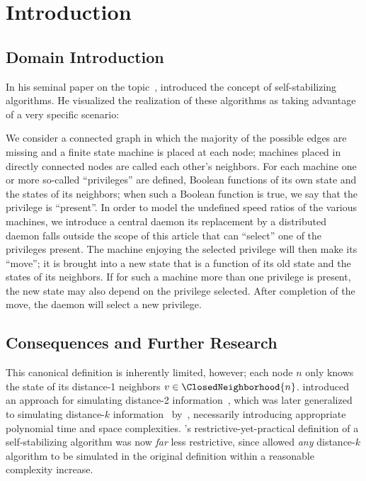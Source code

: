 \section{Introduction}
\label{sec:introduction}
\subsection{Domain Introduction}
In his seminal paper on the topic~\autocite{dew:sem},
  \citeauthor{dew:sem} introduced the concept of
  self-stabilizing algorithms.
He visualized the realization of these algorithms as taking advantage of
  a very specific scenario:
\begin{displayquote}
  We consider a connected graph in which
    the majority of the possible edges are missing and
    a finite state machine is placed at each node;
    machines placed in directly connected nodes are called each other's neighbors.
  For each machine one or more so-called \enquote{privileges} are defined,
    \ie Boolean functions of its own state and the states of its neighbors;
    when such a Boolean function is true,
    we say that the privilege is \enquote{present}.
  In order to model the undefined speed ratios of the various machines,
    we introduce a central daemon \Dash
    its replacement by a distributed daemon falls outside the scope of this article \Dash
    that can \enquote{select} one of the privileges present.
  The machine enjoying the selected privilege will then make its \enquote{move};
    \ie it is brought into a new state that is a function of
    its old state and the states of its neighbors.
  If for such a machine more than one privilege is present,
    the new state may also depend on the privilege selected.
  After completion of the move, the daemon will select a new privilege.
\end{displayquote}

\subsection{Consequences and Further Research}
This canonical definition is inherently limited, however;
  each node $n$ only knows the state of its distance-1 neighbors $v \in \ClosedNeighborhood{n}$.
\citeauthor{gairing:distance-2} introduced an approach for
  simulating distance-2 information~\autocite{gairing:distance-2},
  which was later generalized to simulating distance-$k$
  information~\autocite{goddard:ssa--k-distance} by~\citeauthor{goddard:ssa--k-distance},
  necessarily introducing appropriate polynomial time and space complexities.
\citeauthor{dew:sem}'s restrictive-yet-practical definition
  of a self-stabilizing algorithm
  was now \emph{far} less restrictive,
  since \citeauthor{goddard:ssa--k-distance} allowed \emph{any} distance-$k$ algorithm
  to be simulated in the original definition within a reasonable complexity increase.

